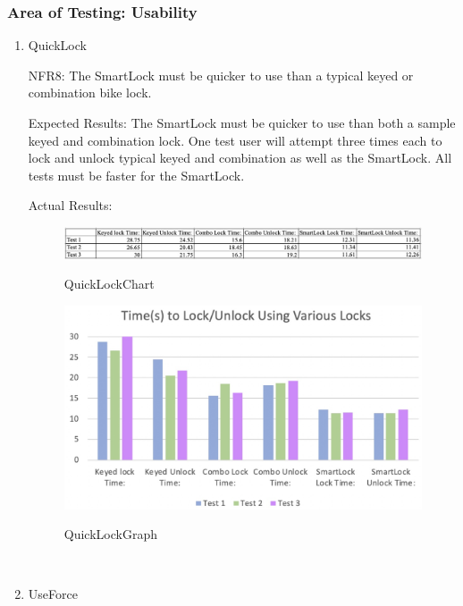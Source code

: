 \documentclass[12pt, titlepage]{article}
\begin{document}
\subsubsection{Area of Testing: Usability}

\begin{enumerate}

\item{QuickLock

NFR8: The SmartLock must be quicker to use than a typical keyed or combination bike lock.  }

Expected Results: The SmartLock must be quicker to use than both a  sample keyed and combination lock. One test user will attempt three times each to lock and unlock typical keyed and combination as well as the SmartLock. All tests must be faster for the SmartLock.

Actual Results:


\begin{figure}[h!]
 \begin{center}
 {
 \includegraphics[width=1\linewidth]{QuickLockChart}
 }
 \caption{\label{QuickLockChart} QuickLockChart}
 \end{center}
 \end{figure}
 \begin{figure}[h!]
 \begin{center}
 {
 \includegraphics[width=1\linewidth]{QuickLockGraph}
 }
 \caption{\label{QuickLockGraph} QuickLockGraph}
 \end{center}
 \end{figure}

~\newpage
\item{UseForce

}
\end{enumerate}
\end{document}
